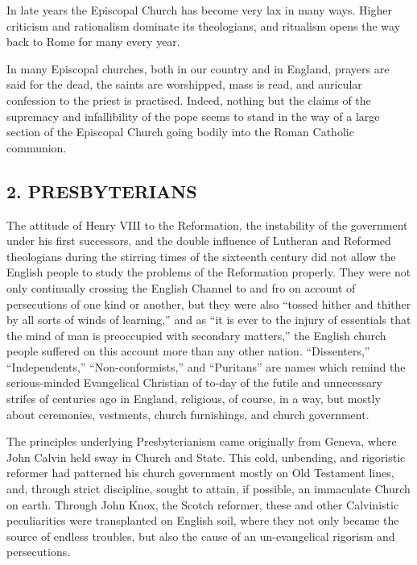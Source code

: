\documentclass[
]{book}
\begin{document}
In late years the Episcopal Church has become very lax in many ways. Higher criticism and rationalism dominate its theologians, and ritualism opens the way back to Rome for many every year.

In many Episcopal churches, both in our country and in England, prayers are said for the dead, the saints are worshipped, mass is read, and auricular confession to the priest is practised. Indeed, nothing but the claims of the supremacy and infallibility of the pope seems to stand in the way of a large section of the Episcopal Church going bodily into the Roman Catholic communion.

\subsection*{\texorpdfstring{2. PRESBYTERIANS}{2. PRESBYTERIANS}}\label{presbyterians}

The attitude of Henry VIII to the Reformation, the instability of the government under his first successors, and the double influence of Lutheran and Reformed theologians during the stirring times of the sixteenth century did not allow the English people to study the problems of the Reformation properly. They were not only continually crossing the English Channel to and fro on account of persecutions of one kind or another, but they were also ``tossed hither and thither by all sorts of winds of learning,'' and as ``it is ever to the injury of essentials that the mind of man is preoccupied with secondary matters,'' the English church people suffered on this account more than any other nation. ``Dissenters,'' ``Independents,'' ``Non-conformists,'' and ``Puritans'' are names which remind the serious-minded Evangelical Christian of to-day of the futile and unnecessary strifes of centuries ago in England, religious, of course, in a way, but mostly about ceremonies, vestments, church furnishings, and church government.

The principles underlying Presbyterianism came originally from Geneva, where John Calvin held sway in Church and State. This cold, unbending, and rigoristic reformer had patterned his church government mostly on Old Testament lines, and, through strict discipline, sought to attain, if possible, an immaculate Church on earth. Through John Knox, the Scotch reformer, these and other Calvinistic peculiarities were transplanted on English soil, where they not only became the source of endless troubles, but also the cause of an un-evangelical rigorism and persecutions.
\end{document}
